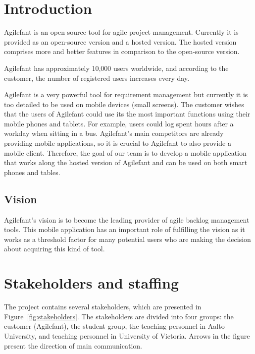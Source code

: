 \section{Introduction}

Agilefant is an open source tool for agile project management. Currently it is
provided as an open-source version and a hosted version. The hosted version
comprises more and better features in comparison to the open-source version.

Agilefant has approximately 10,000 users worldwide, and according to the
customer, the number of registered users increases every day.
 
Agilefant is a very powerful tool for requirement management but currently it is
too detailed to be used on mobile devices (small screens). The customer wishes
that the users of Agilefant could use its the most important functions using
their mobile phones and tablets. For example, users could log spent hours after
a workday when sitting in a bus. Agilefant's main competitors are already
providing mobile applications, so it is crucial to Agilefant to also provide a
mobile client. Therefore, the goal of our team is to develop a mobile
application that works along the hosted version of Agilefant and can be used on
both smart phones and tables.

\subsection{Vision}

Agilefant's vision is to become the leading provider of agile backlog management
tools. This mobile application has an important role of fulfilling the vision as
it works as a threshold factor for many potential users who are making the
decision about acquiring this kind of tool.

\section{Stakeholders and staffing}

The project contains several stakeholders, which are presented in
Figure~\ref{fig:stakeholders}. The stakeholders are divided into four groups:
the customer (Agilefant), the student group, the teaching personnel in Aalto
University, and teaching personnel in University of Victoria. Arrows in the
figure present the direction of main communication.

